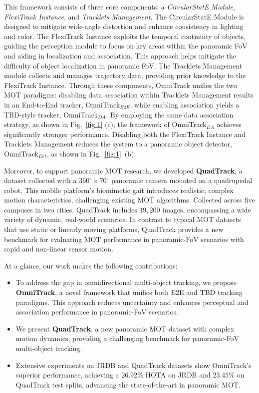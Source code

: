 This framework consists of three core components: a \emph{CircularStatE Module}, \emph{FlexiTrack Instance}, and \emph{Tracklets Management}. 
The CircularStatE Module is designed to mitigate wide-angle distortion and enhance consistency in lighting and color.
The FlexiTrack Instance exploits the temporal continuity of objects, guiding the perception module to focus on key areas within the panoramic FoV and aiding in localization and association. 
This approach helps mitigate the difficulty of object localization in panoramic FoV. 
The Tracklets Management module collects and manages trajectory data, providing prior knowledge to the FlexiTrack Instance. 
Through these components, OmniTrack unifies the two MOT paradigms: disabling data association within Tracklets Management results in an End-to-End tracker, OmniTrack$_{E2E}$, while enabling association yields a TBD-style tracker, OmniTrack$_{DA}$. 
By employing the same data association strategy, as shown in Fig.~\ref{fig:1} (c), the framework of OmniTrack$_{DA}$ achieves significantly stronger performance. 
Disabling both the FlexiTrack Instance and Tracklets Management reduces the system to a panoramic object detector, OmniTrack$_{Det}$, as shown in Fig.~\ref{fig:1}~(b).

%

Moreover, to support panoramic MOT research, we developed \textbf{QuadTrack}, a dataset collected with a $360^{\circ}{\times}70^{\circ}$ panoramic camera mounted on a quadrupedal robot. This mobile platform’s biomimetic gait introduces realistic, complex motion characteristics, challenging existing MOT algorithms. Collected across five campuses in two cities, QuadTrack includes $19,200$ images, encompassing a wide variety of dynamic, real-world scenarios. In contrast to typical MOT datasets~\cite{milan2016mot16, caesar2020nuscenes,dendorfer2020mot20,semantickitti,bdd100k,cui2023sportsmot} that use static or linearly moving platforms, QuadTrack provides a new benchmark for evaluating MOT performance in panoramic-FoV scenarios with rapid and non-linear sensor motion. 

%

At a glance, our work makes the following contributions:
\begin{itemize}
    \item To address the gap in omnidirectional multi-object tracking, we propose \textbf{OmniTrack}, a novel framework that unifies both E2E and TBD tracking paradigms. This approach reduces uncertainty and enhances perceptual and association performance in panoramic-FoV scenarios.

    \item We present \textbf{QuadTrack}, a new panoramic MOT dataset with complex motion dynamics, providing a challenging benchmark for panoramic-FoV multi-object tracking.
    

    \item Extensive experiments on JRDB and QuadTrack datasets show OmniTrack’s superior performance, achieving a $26.92\%$ HOTA on JRDB and $23.45\%$ on QuadTrack test splits, advancing the state-of-the-art in panoramic MOT.
\end{itemize}

%

